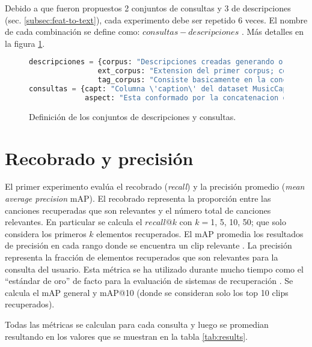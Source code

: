 Debido a que fueron propuestos 2 conjuntos de consultas y 3 de descripciones (sec. \ref{subsec:feat-to-text}), cada experimento debe ser repetido 6 veces. El nombre de cada combinación se define como: $consultas-descripciones$ . Más detalles en la figura  \ref{alg:query-corpus}.
\begin{figure}[h!] 
\begin{lstlisting}[language=Python]
descripciones = {corpus: "Descripciones creadas generando oraciones a partir de feature_description y uniendolas en un texto descriptivo.",
                ext_corpus: "Extension del primer corpus; conteniene los mismos textos y las oraciones que lo componen separadas.",
                tag_corpus: "Consiste basicamente en la concatenacion de todos los features que retornan los modelos de la seccion \ref{subsec:essentia} por cada clip."}
consultas = {capt: "Columna \'caption\' del dataset MusicCaps, son descripciones textuales escritas por musicos.",
             aspect: "Esta conformado por la concatenacion de las etiquetas de la columna \'aspect list\' del dataset MusicCaps."}
\end{lstlisting}
\caption{Definición de los conjuntos de descripciones y consultas.} \label{alg:query-corpus}
\end{figure}

\section{Recobrado y precisión}
\label{sec:experiment1}
El primer experimento evalúa el recobrado (\textit{recall}) y la precisión promedio (\textit{mean average precision} mAP). El recobrado representa la proporción entre las canciones recuperadas que son relevantes y el número total de canciones relevantes. En particular se calcula el $recall@k$ con $k=$1, 5, 10, 50; que solo considera los primeros $k$ elementos recuperados. El mAP promedia los resultados de precisión en cada rango donde se encuentra un clip relevante \cite{mAPAnalyticsYogi}. La precisión representa la fracción de elementos recuperados que son relevantes para la consulta del usuario. Esta métrica se ha utilizado durante mucho tiempo como el “estándar de oro” de facto para la evaluación de sistemas de recuperación \cite{Beitzel2009}. Se calcula el mAP general y mAP@10 (donde se consideran solo los top 10 clips recuperados). 

Todas las métricas se calculan para cada consulta y luego se promedian resultando en los valores que se muestran en la tabla \ref{tab:results}.

